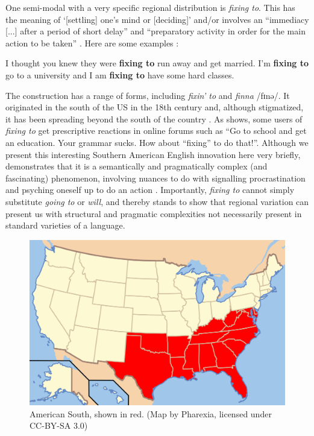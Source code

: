 One semi-modal with a very specific regional distribution is \textit{fixing to}. This has the meaning of `{[}settling{]} one's mind or {[}deciding{]}' \citep[13]{Smith2009} and/or involves an ``immediacy {[}...{]} after a period of short delay'' and ``preparatory activity in order for the main action to be taken'' \citep[335]{Ching1987}. Here are some examples \citep[13, 17]{Smith2009}: 
\begin{exe}
    \ex I thought you knew they were \textbf{fixing to} run away and get married.
    \ex I'm \textbf{fixing to} go to a university and I am \textbf{fixing to} have some hard classes.
\end{exe}
The construction has a range of forms, including \textit{fixin' to} and \textit{finna} /fɪnə/. It originated in the south of the US in the 18th century and, although stigmatized, it has been spreading beyond the south of the country \citep{Smith2009}. As \citet[17]{Smith2009} shows, some users of \textit{fixing to} get prescriptive reactions in online forums such as ``Go to school and get an education. Your grammar sucks. How about ``fixing'' to do that!''. Although we present this interesting Southern American English innovation here very briefly, \citet{Ching1987} demonstrates that it is a semantically and pragmatically complex (and fascinating) phenomenon, involving nuances to do with signalling procrastination and psyching oneself up to do an action \citep[336]{Ching1987}. Importantly, \textit{fixing to} cannot simply substitute \textit{going to} or \textit{will}, and thereby stands to show that regional variation can present us with structural and pragmatic complexities not necessarily present in standard varieties of a language.

\begin{figure}
    \includegraphics[width=\textwidth]{chapters/img/1024px-Map_of_USA_South.svg.png}
    \caption{American South, shown in red. (Map by Pharexia, licensed under CC-BY-SA 3.0)}
    \label{fig:American South}
\end{figure}

